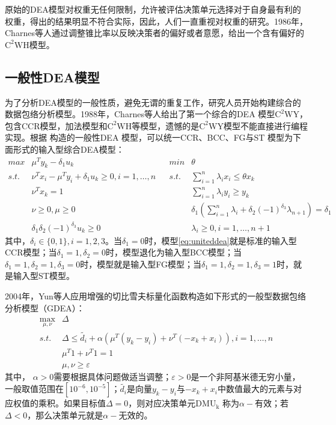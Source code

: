 原始的DEA模型对权重无任何限制，允许被评估决策单元选择对于自身最有利的权重，得出的结果明显不符合实际，因此，人们一直重视对权重的研究。1986年，Charnes等人\cite{charnes1989cone}通过调整锥比率以反映决策者的偏好或者意愿，给出一个含有偏好的$\mathrm{C^2WH}$模型。

\subsection{一般性DEA模型}
为了分析DEA模型的一般性质，避免无谓的重复工作，研究人员开始构建综合的数据包络分析模型。1988年，Charnes等人\cite{charnes1988compositive}给出了第一个综合的DEA 模型$\mathrm{C^2WY}$，包含CCR模型，加法模型和$\mathrm{C^2WH}$等模型，遗憾的是$\mathrm{C^2WY}$模型不能直接进行编程实现。根据
\cite{yu1996generalized}构造的一般性DEA 模型，可以统一CCR、BCC、FG与ST 模型为下面形式的输入型综合DEA模型：
\begin{equation}\label{eq:uniteddea}
  \begin{array}{lllll}
    \textit{max} & \mu^T y_k - \delta_1 u_k & & \textit{min} & \theta\\
    \textit{s.t.} & \nu^T x_i - \mu^T y_i + \delta_1 u_k \ge 0, i = 1,\ldots, n & & \textit{s.t.} & \sum\limits_{i=1}^n \lambda_i x_i \le \theta x_k\\
    & \nu^T x_k = 1 & & & \sum\limits_{i=1}^n \lambda_i y_i \ge y_k\\
    & \nu \ge 0,\mu \ge 0 & & & \delta_1(\sum\limits_{i=1}^n \lambda_i + \delta_2(-1)^{\delta_3}\lambda_{n+1}) = \delta_1\\
    & \delta_1\delta_2(-1)^{\delta_3} u_k \ge 0 & & & \lambda_i \ge 0, i = 1,\ldots, n+1
  \end{array}
\end{equation}
其中，$\delta_i\in \{0,1\},i =1,2,3$。当$\delta_1 = 0$时，模型\eqref{eq:uniteddea}就是标准的输入型CCR模型；当$\delta_1=1,\delta_2 = 0$时，模型退化为输入型BCC模型；当$\delta_1=1,\delta_2 = 1,\delta_3 = 0$时，模型就是输入型FG模型；当$\delta_1=1,\delta_2 = 1,\delta_3=1$时，就是输入型ST模型。

2004年，Yun等人\cite{yun2004generalized}应用增强的切比雪夫标量化函数构造如下形式的一般型数据包络分析模型（GDEA）：
\begin{equation}\label{eq:gdea}
\begin{array}{ll}
\max\limits_{\mu, \nu}& \Delta\\
\textit{s.t.}& \Delta \le \widetilde{d_i} + \alpha(\mu^T (y_k - y_i) + \nu^T(-x_k + x_i)), i = 1,\ldots, n\\
& \mu^T 1 + \nu^T 1 = 1\\
& \mu,\nu \ge \varepsilon
\end{array}
\end{equation}
其中， $\alpha>0$需要根据具体问题做适当调整；$\varepsilon>0$是一个非阿基米德无穷小量，一般取值范围在$[10^{-6},10^{-5}]$；$\widetilde{d_i}$是向量$y_k - y_i$与$-x_k + x_i$中数值最大的元素与对应权值的乘积。如果目标值$\Delta = 0$，则对应决策单元$\mathrm{DMU_k}$ 称为$\alpha-$有效；若$\Delta < 0$，那么决策单元就是$\alpha-$无效的。

